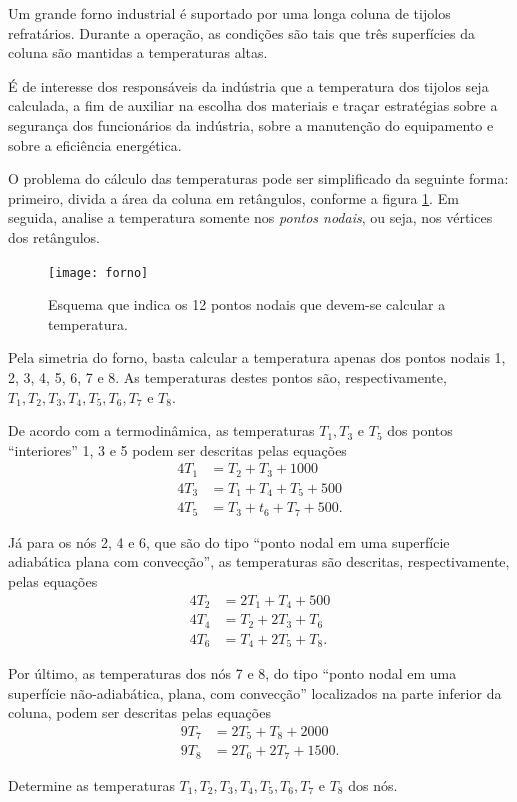 \begin{ex}\label{ex.forno}
Um grande forno industrial é suportado por uma longa coluna de tijolos refratários. Durante a operação, as condições são tais que três superfícies da coluna são mantidas a temperaturas altas. 

É de interesse dos responsáveis da indústria que a temperatura dos tijolos seja calculada, a fim de auxiliar na escolha dos materiais e traçar estratégias sobre a segurança dos funcionários da indústria, sobre a manutenção do equipamento e sobre a eficiência energética.


O problema do cálculo das temperaturas pode ser simplificado da seguinte forma: primeiro, divida a área da coluna em retângulos, conforme a figura \ref{fig.forno}. Em seguida, analise a temperatura somente nos \emph{pontos nodais}, ou seja, nos vértices dos retângulos.

\begin{figure}[hb]
\center
\texttt{[image: forno]}
\caption{Esquema que indica os 12 pontos nodais que devem-se calcular a temperatura.}\label{fig.forno}
\end{figure}

Pela simetria do forno, basta calcular a temperatura apenas dos pontos nodais 1, 2, 3, 4, 5, 6, 7 e 8. As temperaturas destes pontos são, respectivamente, $T_1, T_2, T_3, T_4, T_5, T_6, T_7$ e $T_8$.


De acordo com a termodinâmica, as temperaturas $T_1, T_3$ e $T_5$ dos pontos ``interiores'' 1, 3 e 5 podem ser descritas pelas equações
\begin{align*}
4T_1&=T_2+T_3+1000\\
4T_3&=T_1+T_4+T_5+500\\
4T_5&=T_3+t_6+T_7+500.
\end{align*}

Já para os nós 2, 4 e 6, que são do tipo ``ponto nodal em uma superfície adiabática plana com convecção'', as temperaturas são descritas, respectivamente, pelas equações
\begin{align*}
4T_2&=2T_1+T_4+500\\
4T_4&=T_2+2T_3+T_6\\
4T_6&=T_4+2T_5+T_8.
\end{align*}


Por último, as temperaturas dos nós 7 e 8, do tipo ``ponto nodal em uma superfície não-adiabática, plana, com convecção'' localizados na parte inferior da coluna, podem ser
descritas pelas equações
\begin{align*}
9T_7&=2T_5 + T_8 + 2000\\
9T_8&=2T_6 + 2T_7 + 1500.
\end{align*}

Determine as temperaturas $T_1, T_2, T_3, T_4, T_5, T_6, T_7$ e $T_8$ dos nós.
\end{ex}

